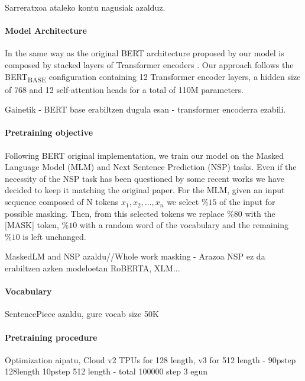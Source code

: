 \documentclass[10pt, a4paper]{article}
\begin{document}
Sarreratxoa ataleko kontu nagusiak azalduz. 

\paragraph{Model Architecture}

In the same way as the original BERT architecture proposed by  our model is composed by stacked layers of Transformer encoders \cite{vaswani2017attention}. Our approach follows the BERT\textsubscript{BASE} configuration containing 12 Transformer encoder layers, a hidden size of 768 and 12 self-attention heads for a total of 110M parameters. 

Gainetik - BERT base erabiltzen dugula esan - transformer encoderra ezabili.

\paragraph{Pretraining objective}

Following BERT original implementation, we train our model on the Masked Language Model (MLM) and Next Sentence Prediction (NSP) tasks. Even if the necessity of the NSP task has been questioned by some recent works \cite{yang2019xlnet,liu2019roberta,lample2019cross} we have decided to keep it matching the original paper. For the MLM, given an input sequence composed of N tokens $x_1, x_2, ..., x_n$ we select $\%15$ of the input for possible masking. Then, from this selected tokens we replace $\%80$ with the [MASK] token, $\%10$ with a random word of the vocabulary and the remaining $\%10$ is left unchanged.  

MaskedLM and NSP azaldu//Whole work masking - Arazoa NSP ez da erabiltzen azken modeloetan RoBERTA, XLM...


\paragraph{Vocabulary}

SentencePiece azaldu,  gure vocab size 50K

\paragraph{Pretraining procedure}

Optimization aipatu, Cloud v2 TPUs for 128 length, v3 for 512 length - 90pstep 128length 10pstep 512 length - total 100000 step 3 egun
\end{document}
